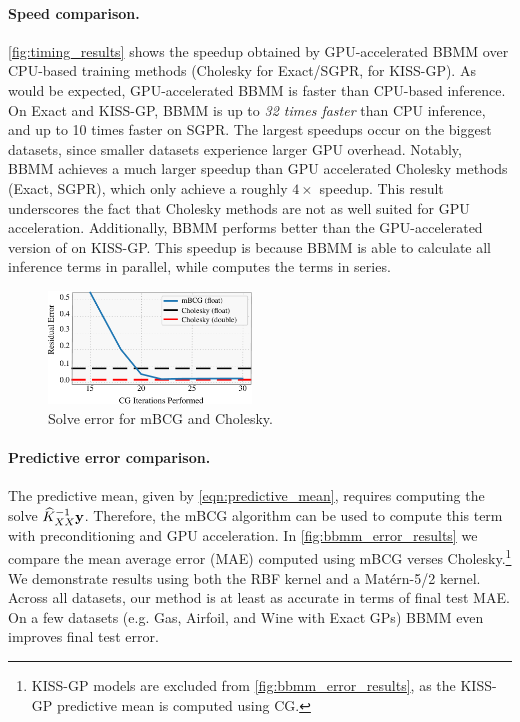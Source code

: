\paragraph{Speed comparison.}
\cref{fig:timing_results} shows the speedup obtained by GPU-accelerated BBMM over CPU-based training methods (Cholesky for Exact/SGPR, \citet{dong2017scalable} for KISS-GP).
As would be expected, GPU-accelerated BBMM is faster than CPU-based inference.
On Exact and KISS-GP, BBMM is up to \emph{32 times faster} than CPU inference, and up to 10 times faster on SGPR.
The largest speedups occur on the biggest datasets, since smaller datasets experience larger GPU overhead.
Notably, BBMM achieves a much larger speedup than GPU accelerated Cholesky methods (Exact, SGPR), which only achieve a roughly $4\times$ speedup.
This result underscores the fact that Cholesky methods are not as well suited for GPU acceleration.
Additionally, BBMM performs better than the GPU-accelerated version of \cite{dong2017scalable} on KISS-GP.
This speedup is because BBMM is able to calculate all inference terms in parallel, while \cite{dong2017scalable} computes the terms in series.

\begin{figure}[t!]
  \begin{center}
    \includegraphics[width=0.48\textwidth]{figures/cg_error}
  \end{center}
  \caption{Solve error for mBCG and Cholesky. \label{fig:cg_error}}
\end{figure}

\paragraph{Predictive error comparison.}
The predictive mean, given by \cref{eqn:predictive_mean}, requires computing the solve $\widehat{K}_{XX}^{-1} \mathbf{y}$.
Therefore, the mBCG algorithm can be used to compute this term with preconditioning and GPU acceleration.
In \cref{fig:bbmm_error_results} we compare the mean average error (MAE) computed using mBCG verses Cholesky.\footnote{
  KISS-GP models are excluded from \cref{fig:bbmm_error_results}, as the KISS-GP predictive mean is computed using CG.
}
We demonstrate results using both the RBF kernel and a Mat\'ern-5/2 kernel.
Across all datasets, our method is at least as accurate in terms of final test MAE.
On a few datasets (e.g. Gas, Airfoil, and Wine with Exact GPs) BBMM even improves final test error.

